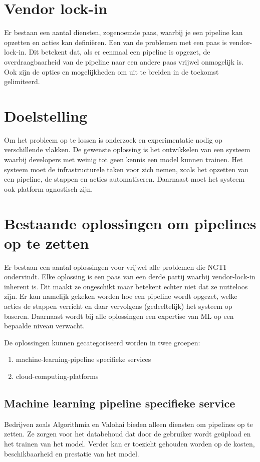 \section{Vendor lock-in}\label{sec:vendor-lock-in}
Er bestaan een aantal diensten, zogenoemde \acrfull{paas}, waarbij je een pipeline kan opzetten en acties kan definiëren. Een van de problemen met een \acrshort{paas} is \gls{vendor-lock-in}. Dit betekent dat, als er eenmaal een pipeline is opgezet, de overdraagbaarheid van de pipeline naar een andere \acrshort{paas} vrijwel onmogelijk is. Ook zijn de opties en mogelijkheden om uit te breiden in de toekomst gelimiteerd.

\section{Doelstelling}\label{sec:doelstelling}
Om het probleem op te lossen is onderzoek en experimentatie nodig op verschillende vlakken. De gewenste oplossing is het ontwikkelen van een systeem waarbij developers met weinig tot geen kennis een model kunnen trainen. Het systeem moet de infrastructurele taken voor zich nemen, zoals het opzetten van een pipeline, de stappen en acties automatiseren. Daarnaast moet het systeem ook platform agnostisch zijn.

\section{Bestaande oplossingen om pipelines op te zetten}\label{sec:bestaande-oplossingen-om-pipelines-op-te-zetten}
Er bestaan een aantal oplossingen voor vrijwel alle problemen die NGTI ondervindt. Elke oplossing is een \acrshort{paas} van een derde partij waarbij \gls{vendor-lock-in} inherent is. Dit maakt ze ongeschikt maar betekent echter niet dat ze nutteloos zijn. Er kan namelijk gekeken worden hoe een pipeline wordt opgezet, welke acties de stappen verricht en daar vervolgens (gedeeltelijk) het systeem op baseren. Daarnaast wordt bij alle oplossingen een expertise van ML op een bepaalde niveau verwacht.

De oplossingen kunnen gecategoriseerd worden in twee groepen:
\begin{enumerate}
  \item \Gls{machine-learning-pipeline} specifieke services
  \item \Glspl{cloud-computing-platform}
\end{enumerate}

\subsection{Machine learning pipeline specifieke service}\label{subsec:machine-learning-pipeline-specifieke-service}
Bedrijven zoals Algorithmia \cite{algorithmia-website} en Valohai \cite{valohai-website} bieden alleen diensten om pipelines op te zetten. Ze zorgen voor het databehoud dat door de gebruiker wordt geüpload en het trainen van het model. Verder kan er toezicht gehouden worden op de kosten, beschikbaarheid en prestatie van het model.

